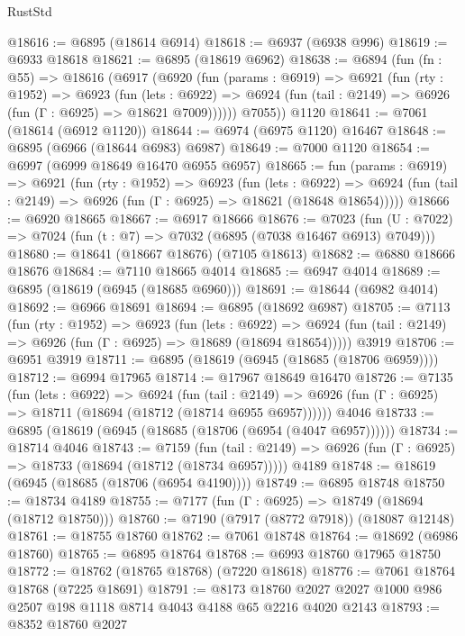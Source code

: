 \begin{lexlean}{RustStd}
\begin{coremodule}
@18616 := @6895 (@18614 @6914)
@18618 := @6937 (@6938 @996)
@18619 := @6933 @18618
@18621 := @6895 (@18619 @6962)
@18638 := @6894
    (fun (fn : @55) =>
    @18616
      (@6917
        (@6920
          (fun (params : @6919) =>
          @6921
            (fun (rty : @1952) =>
            @6923
              (fun (lets : @6922) =>
              @6924 (fun (tail : @2149) => @6926 (fun (Γ : @6925) => @18621 @7009))))))
        @7055))
    @1120
@18641 := @7061 (@18614 (@6912 @1120))
@18644 := @6974 (@6975 @1120) @16467
@18648 := @6895 (@6966 (@18644 @6983) @6987)
@18649 := @7000 @1120
@18654 := @6997 (@6999 @18649 @16470 @6955 @6957)
@18665 := fun (params : @6919) =>
  @6921
    (fun (rty : @1952) =>
    @6923
      (fun (lets : @6922) =>
      @6924 (fun (tail : @2149) => @6926 (fun (Γ : @6925) => @18621 (@18648 @18654)))))
@18666 := @6920 @18665
@18667 := @6917 @18666
@18676 := @7023
    (fun (U : @7022) => @7024 (fun (t : @7) => @7032 (@6895 (@7038 @16467 @6913) @7049)))
@18680 := @18641 (@18667 @18676) (@7105 @18613)
@18682 := @6880 @18666 @18676
@18684 := @7110 @18665 @4014
@18685 := @6947 @4014
@18689 := @6895 (@18619 (@6945 (@18685 @6960)))
@18691 := @18644 (@6982 @4014)
@18692 := @6966 @18691
@18694 := @6895 (@18692 @6987)
@18705 := @7113
    (fun (rty : @1952) =>
    @6923
      (fun (lets : @6922) =>
      @6924 (fun (tail : @2149) => @6926 (fun (Γ : @6925) => @18689 (@18694 @18654)))))
    @3919
@18706 := @6951 @3919
@18711 := @6895 (@18619 (@6945 (@18685 (@18706 @6959))))
@18712 := @6994 @17965
@18714 := @17967 @18649 @16470
@18726 := @7135
    (fun (lets : @6922) =>
    @6924
      (fun (tail : @2149) =>
      @6926 (fun (Γ : @6925) => @18711 (@18694 (@18712 (@18714 @6955 @6957))))))
    @4046
@18733 := @6895 (@18619 (@6945 (@18685 (@18706 (@6954 (@4047 @6957))))))
@18734 := @18714 @4046
@18743 := @7159
    (fun (tail : @2149) => @6926 (fun (Γ : @6925) => @18733 (@18694 (@18712 (@18734 @6957)))))
    @4189
@18748 := @18619 (@6945 (@18685 (@18706 (@6954 @4190))))
@18749 := @6895 @18748
@18750 := @18734 @4189
@18755 := @7177 (fun (Γ : @6925) => @18749 (@18694 (@18712 @18750)))
@18760 := @7190 (@7917 (@8772 @7918)) (@18087 @12148)
@18761 := @18755 @18760
@18762 := @7061 @18748
@18764 := @18692 (@6986 @18760)
@18765 := @6895 @18764
@18768 := @6993 @18760 @17965 @18750
@18772 := @18762 (@18765 @18768) (@7220 @18618)
@18776 := @7061 @18764 @18768 (@7225 @18691)
@18791 := @8173
    @18760
    @2027
    @2027
    @1000
    @986
    @2507
    @198
    @1118
    @8714
    @4043
    @4188
    @65
    @2216
    @4020
    @2143
@18793 := @8352 @18760 @2027

\end{coremodule}
\end{lexlean}
